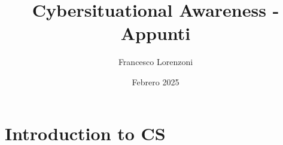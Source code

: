 


\title{Cybersituational Awareness - Appunti}
\author{Francesco Lorenzoni}
\date{Febrero 2025}


\makeatletter
\renewcommand{\l@section}{\@dottedtocline{1}{1.5em}{2.6em}}
\renewcommand{\l@subsection}{\@dottedtocline{2}{2.5em}{3.6em}}
\renewcommand{\l@subsubsection}{\@dottedtocline{3}{3.5em}{4.5em}}
\makeatother
{} %




\doparttoc[n]

\maketitle
\tableofcontents

\part{Introduction to CS}
\parttoc







